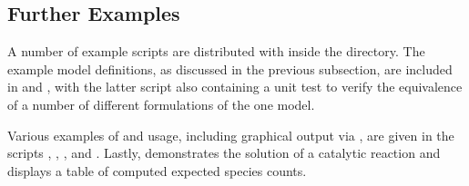 \subsection{Further Examples}

A number of example scripts are distributed with \cmepy{} inside the
 directory. The example model definitions,
as discussed in the previous subsection, are included in
 and  , with
the latter script also containing a unit test to verify the equivalence of
a number of different formulations of the one model.

Various examples of  and  usage,
including graphical output via \matplotlib{}, are
given in the scripts
,
,
,
and
 .
Lastly,  demonstrates the solution of
a catalytic reaction and displays a table of computed expected species counts.